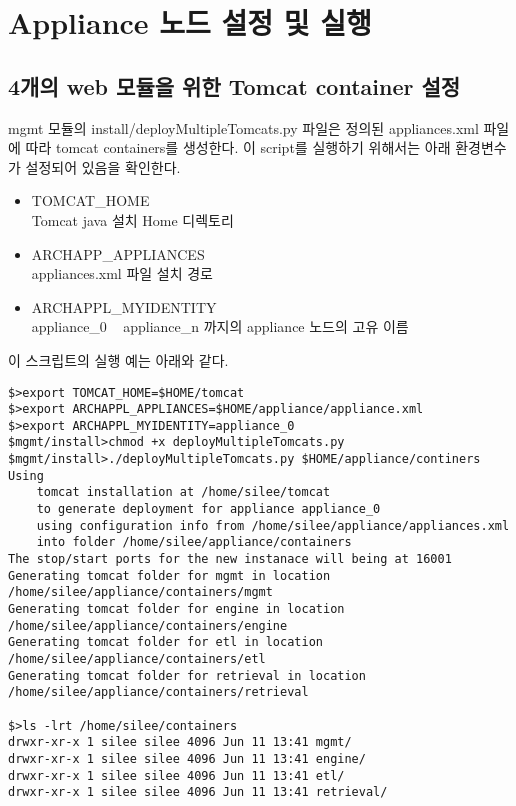 \documentclass[11pt
  , a4paper
  , article
  , oneside
]{memoir}
\begin{document}
\section{Appliance 노드 설정 및 실행}
\subsection {4개의 web 모듈을 위한 Tomcat container 설정}
 mgmt 모듈의 install/deployMultipleTomcats.py 파일은 정의된 appliances.xml 파일에 따라 tomcat containers를 생성한다. 이 script를 실행하기 위해서는 아래 환경변수가 설정되어 있음을 확인한다.
 \begin{itemize}
 	\item TOMCAT\_HOME \\
 	Tomcat java 설치 Home 디렉토리
 	\item ARCHAPP\_APPLIANCES \\
 	appliances.xml 파일 설치 경로 
 	\item ARCHAPPL\_MYIDENTITY \\
 	appliance\_0 ~ appliance\_n 까지의 appliance 노드의 고유 이름
 \end{itemize}
 
 이 스크립트의 실행 예는 아래와 같다.
 
\begin{lstlisting}[style=termstyle]
$>export TOMCAT_HOME=$HOME/tomcat
$>export ARCHAPPL_APPLIANCES=$HOME/appliance/appliance.xml
$>export ARCHAPPL_MYIDENTITY=appliance_0
$mgmt/install>chmod +x deployMultipleTomcats.py
$mgmt/install>./deployMultipleTomcats.py $HOME/appliance/continers
Using
    tomcat installation at /home/silee/tomcat
    to generate deployment for appliance appliance_0
    using configuration info from /home/silee/appliance/appliances.xml
    into folder /home/silee/appliance/containers
The stop/start ports for the new instanace will being at 16001
Generating tomcat folder for mgmt in location /home/silee/appliance/containers/mgmt
Generating tomcat folder for engine in location /home/silee/appliance/containers/engine
Generating tomcat folder for etl in location /home/silee/appliance/containers/etl
Generating tomcat folder for retrieval in location /home/silee/appliance/containers/retrieval

$>ls -lrt /home/silee/containers
drwxr-xr-x 1 silee silee 4096 Jun 11 13:41 mgmt/
drwxr-xr-x 1 silee silee 4096 Jun 11 13:41 engine/
drwxr-xr-x 1 silee silee 4096 Jun 11 13:41 etl/
drwxr-xr-x 1 silee silee 4096 Jun 11 13:41 retrieval/
\end{lstlisting}
\end{document}
